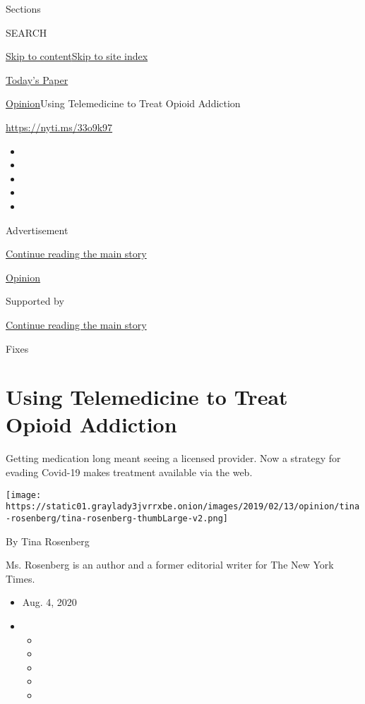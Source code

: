 Sections

SEARCH

\protect\hyperlink{site-content}{Skip to
content}\protect\hyperlink{site-index}{Skip to site index}

\href{https://myaccount.nytimes3xbfgragh.onion/auth/login?response_type=cookie\&client_id=vi}{}

\href{https://www.nytimes3xbfgragh.onion/section/todayspaper}{Today's
Paper}

\href{/section/opinion}{Opinion}\textbar{}Using Telemedicine to Treat
Opioid Addiction

\url{https://nyti.ms/33o9k97}

\begin{itemize}
\item
\item
\item
\item
\item
\end{itemize}

Advertisement

\protect\hyperlink{after-top}{Continue reading the main story}

\href{/section/opinion}{Opinion}

Supported by

\protect\hyperlink{after-sponsor}{Continue reading the main story}

Fixes

\hypertarget{using-telemedicine-to-treat-opioid-addiction}{%
\section{Using Telemedicine to Treat Opioid
Addiction}\label{using-telemedicine-to-treat-opioid-addiction}}

Getting medication long meant seeing a licensed provider. Now a strategy
for evading Covid-19 makes treatment available via the web.

\texttt{[image: https://static01.graylady3jvrrxbe.onion/images/2019/02/13/opinion/tina-rosenberg/tina-rosenberg-thumbLarge-v2.png]}

By Tina Rosenberg

Ms. Rosenberg is an author and a former editorial writer for The New
York Times.

\begin{itemize}
\item
  Aug. 4, 2020
\item
  \begin{itemize}
  \item
  \item
  \item
  \item
  \item
  \end{itemize}
\end{itemize}

